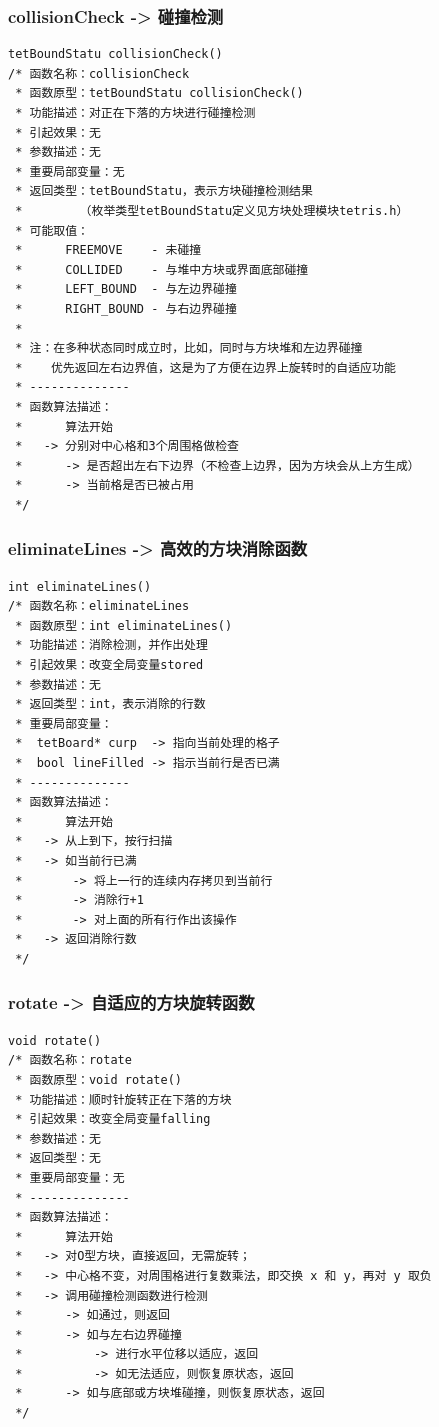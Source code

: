 \documentclass{style/ucasproposal}
\begin{document}
\subsubsection{collisionCheck -> 碰撞检测}
\label{func:collisionCheck}
\begin{verbatim}
tetBoundStatu collisionCheck()
/* 函数名称：collisionCheck
 * 函数原型：tetBoundStatu collisionCheck()
 * 功能描述：对正在下落的方块进行碰撞检测
 * 引起效果：无
 * 参数描述：无
 * 重要局部变量：无
 * 返回类型：tetBoundStatu，表示方块碰撞检测结果
 *        （枚举类型tetBoundStatu定义见方块处理模块tetris.h）
 * 可能取值：
 *      FREEMOVE    - 未碰撞
 *      COLLIDED    - 与堆中方块或界面底部碰撞
 *      LEFT_BOUND  - 与左边界碰撞
 *      RIGHT_BOUND - 与右边界碰撞
 *
 * 注：在多种状态同时成立时，比如，同时与方块堆和左边界碰撞
 *    优先返回左右边界值，这是为了方便在边界上旋转时的自适应功能
 * --------------
 * 函数算法描述：
 *      算法开始
 *   -> 分别对中心格和3个周围格做检查
 *      -> 是否超出左右下边界（不检查上边界，因为方块会从上方生成）
 *      -> 当前格是否已被占用
 */
\end{verbatim}

\subsubsection{eliminateLines -> 高效的方块消除函数}
\label{func:eliminateLines}
\begin{verbatim}
int eliminateLines()
/* 函数名称：eliminateLines
 * 函数原型：int eliminateLines()
 * 功能描述：消除检测，并作出处理
 * 引起效果：改变全局变量stored
 * 参数描述：无
 * 返回类型：int，表示消除的行数
 * 重要局部变量：
 *  tetBoard* curp  -> 指向当前处理的格子
 *  bool lineFilled -> 指示当前行是否已满
 * --------------
 * 函数算法描述：
 *      算法开始
 *   -> 从上到下，按行扫描
 *   -> 如当前行已满
 *       -> 将上一行的连续内存拷贝到当前行
 *       -> 消除行+1
 *       -> 对上面的所有行作出该操作
 *   -> 返回消除行数
 */
\end{verbatim}

\subsubsection{rotate -> 自适应的方块旋转函数}
\label{func:rotate}
\begin{verbatim}
void rotate()
/* 函数名称：rotate
 * 函数原型：void rotate()
 * 功能描述：顺时针旋转正在下落的方块
 * 引起效果：改变全局变量falling
 * 参数描述：无
 * 返回类型：无
 * 重要局部变量：无
 * --------------
 * 函数算法描述：
 *      算法开始
 *   -> 对O型方块，直接返回，无需旋转；
 *   -> 中心格不变，对周围格进行复数乘法，即交换 x 和 y，再对 y 取负
 *   -> 调用碰撞检测函数进行检测
 *      -> 如通过，则返回
 *      -> 如与左右边界碰撞
 *          -> 进行水平位移以适应，返回
 *          -> 如无法适应，则恢复原状态，返回
 *      -> 如与底部或方块堆碰撞，则恢复原状态，返回
 */
\end{verbatim}
\end{document}
